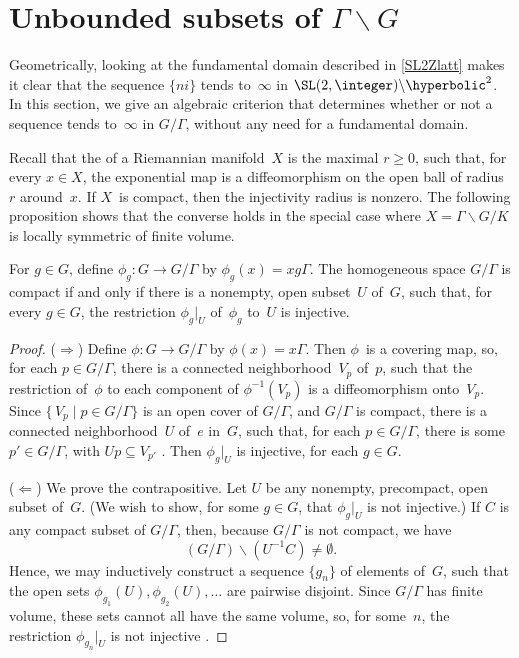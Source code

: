 \section{\texorpdfstring{Unbounded subsets of $\Gamma \backslash G$}{Unbounded subsets of G/Γ}} %
\label{DivergeSect}

 Geometrically, looking at the fundamental
domain described in \cref{SL2Zlatt} makes it clear that the sequence
$\{ni\}$ tends to~$\infty$ in $\SL(2,\integer) \backslash
\hyperbolic^2$. In this section, we give an algebraic
criterion that determines whether or not a sequence tends
to~$\infty$ in $G/\Gamma$, without any need for
a fundamental domain.

Recall that the  of a Riemannian
manifold~$X$ is the maximal $r \ge 0$, such that, for
every $x \in X$, the exponential map is a diffeomorphism
on the open ball of radius~$r$ around~$x$. If $X$~is
compact, then the injectivity radius is nonzero. The
following proposition shows that the converse holds in the
special case where $X = \Gamma \backslash G/K$ is locally
symmetric of finite volume.

\begin{prop} \label{Cpct<>InjRad}
 For $g \in G$, define $\phi_g \colon G \to G/\Gamma$ by 
 $\phi_g(x) = xg\Gamma$. The homogeneous
space $G/\Gamma$ is compact if and only if
there is a nonempty, open subset~$U$ of~$G$, such that,
for every $g \in G$, the restriction $\phi_g|_U$
of~$\phi_g$ to~$U$ is injective.
 \end{prop}

\begin{proof}
 ($\Rightarrow$) Define $\phi \colon G \to G/\Gamma$ 
 by $\phi(x) = x \Gamma$. Then $\phi$~is a
covering map, so, for each $p \in G/\Gamma$,
there is a connected neighborhood~$V_p$ of~$p$, such that
the restriction of~$\phi$ to each component of
$\phi^{-1}(V_p)$ is a diffeomorphism onto~$V_p$. Since
$\{\, V_p \mid p \in G/\Gamma\}$ is an open
cover of $G/\Gamma$, and $G/\Gamma$
is compact, there is a connected neighborhood~$U$ of~$e$
in~$G$, such that, for each $p \in G/\Gamma$,
there is some $p' \in G/\Gamma$, with $Up
\subseteq V_{p'}$ . Then $\phi_g|_U$
is injective, for each $g \in G$.

($\Leftarrow$) We prove the contrapositive. Let $U$ be any
nonempty, precompact, open subset of~$G$. (We wish to show,
for some $g \in G$, that $\phi_g|_U$ is not injective.)
 If $C$ is any compact subset of $G/\Gamma$,
then, because $G/\Gamma$ is not compact, we
have 
 $$ (G/\Gamma) \smallsetminus (U^{-1} C) \neq
\emptyset .$$
 Hence, we may inductively construct a sequence
$\{g_n\}$ of elements of~$G$, such that the open sets
$\phi_{g_1}(U), \phi_{g_2}(U), \ldots$ are pairwise
disjoint. Since $G/\Gamma$ has finite volume,
these sets cannot all have the same volume, so, for
some~$n$, the restriction $\phi_{g_n}|_U$ is not injective
. 
 \end{proof}


